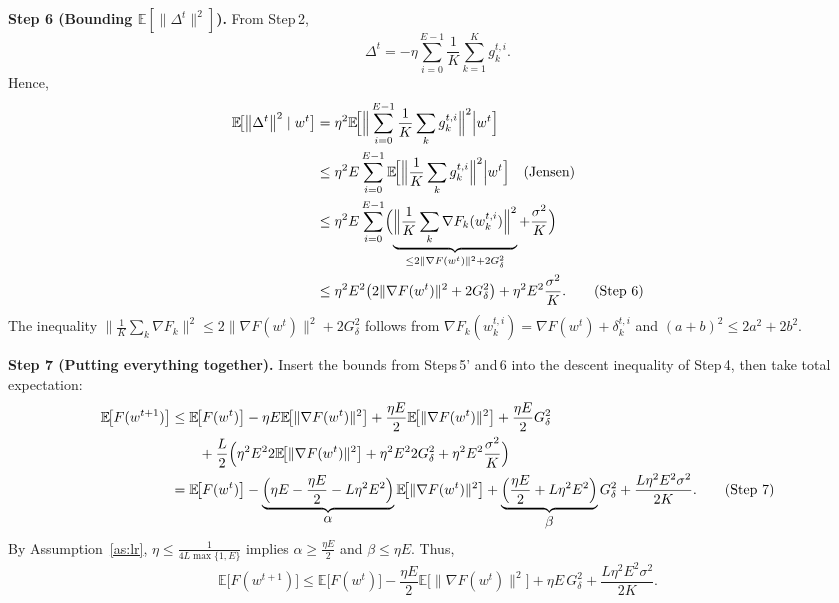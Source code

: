 \documentclass{article}
\newcommand{\EE}{\mathbb{E}}
\newcommand{\norm}[1]{\left\|#1\right\|}
\begin{document}
\noindent\textbf{Step 6 (Bounding $\EE[\|\Delta^{t}\|^{2}]$).}
From Step 2,
\[
\Delta^{t}= -\eta\sum_{i=0}^{E-1}\frac1K\sum_{k=1}^{K} g_{k}^{t,i}.
\]
Hence,
\begin{align}
\EE\!\bigl[\norm{\Delta^{t}}^{2}\mid w^{t}\bigr]
&= \eta^{2}\EE\!\Bigl[\Big\|\sum_{i=0}^{E-1}\frac1K\sum_{k} g_{k}^{t,i}\Big\|^{2}\Big| w^{t}\Bigr] \nonumber\\
&\le \eta^{2}E\sum_{i=0}^{E-1}\EE\!\Bigl[\Big\|\frac1K\sum_{k} g_{k}^{t,i}\Big\|^{2}\Big| w^{t}\Bigr] \quad (\text{Jensen}) \nonumber\\
&\le \eta^{2}E\sum_{i=0}^{E-1}
\Bigl(\underbrace{\Big\|\frac1K\sum_{k}\nabla F_k(w_{k}^{t,i})\Big\|^{2}}_{\le 2\|\nabla F(w^{t})\|^{2}+2G_{\delta}^{2}}
    +\frac{\sigma^{2}}{K}\Bigr) \nonumber\\
&\le \eta^{2}E^{2}\bigl(2\|\nabla F(w^{t})\|^{2}+2G_{\delta}^{2}\bigr)
   +\eta^{2}E^{2}\frac{\sigma^{2}}{K}. \tag{Step 6}
\end{align}
The inequality $\big\|\frac1K\sum_k\nabla F_k\big\|^{2}
\le 2\|\nabla F(w^{t})\|^{2}+2G_{\delta}^{2}$ follows from
$\nabla F_k(w_{k}^{t,i})=\nabla F(w^{t})+\delta_{k}^{t,i}$ and
$(a+b)^{2}\le 2a^{2}+2b^{2}$.

\noindent\textbf{Step 7 (Putting everything together).}
Insert the bounds from Steps 5' and 6 into the descent inequality of
Step 4, then take total expectation:
\begin{align}
\EE\!\bigl[F(w^{t+1})\bigr]
&\le \EE\!\bigl[F(w^{t})\bigr]
   -\eta E\EE\!\bigl[\|\nabla F(w^{t})\|^{2}\bigr]
   +\frac{\eta E}{2}\EE\!\bigl[\|\nabla F(w^{t})\|^{2}\bigr]
   +\frac{\eta E}{2}G_{\delta}^{2} \nonumber\\
&\qquad
   +\frac{L}{2}\Bigl(\eta^{2}E^{2}2\EE\!\bigl[\|\nabla F(w^{t})\|^{2}\bigr]
                     +\eta^{2}E^{2}2G_{\delta}^{2}
                     +\eta^{2}E^{2}\frac{\sigma^{2}}{K}\Bigr) \nonumber\\
&= \EE\!\bigl[F(w^{t})\bigr]
   -\underbrace{\Bigl(\eta E-\frac{\eta E}{2}-L\eta^{2}E^{2}\Bigr)}_{\displaystyle
        \alpha}\EE\!\bigl[\|\nabla F(w^{t})\|^{2}\bigr]
   +\underbrace{\Bigl(\frac{\eta E}{2}+L\eta^{2}E^{2}\Bigr)}_{\displaystyle \beta}
      G_{\delta}^{2}
   +\frac{L\eta^{2}E^{2}\sigma^{2}}{2K}. \tag{Step 7}
\end{align}
By Assumption~\ref{as:lr}, $\eta\le\frac{1}{4L\max\{1,E\}}$ implies
$\alpha\ge \frac{\eta E}{2}$ and $\beta\le \eta E$.
Thus,
\[
\EE\!\bigl[F(w^{t+1})\bigr]
\le \EE\!\bigl[F(w^{t})\bigr]
   -\frac{\eta E}{2}\EE\!\bigl[\|\nabla F(w^{t})\|^{2}\bigr]
   +\eta E\,G_{\delta}^{2}
   +\frac{L\eta^{2}E^{2}\sigma^{2}}{2K}. \tag{Step 7'}
\]
\end{document}
